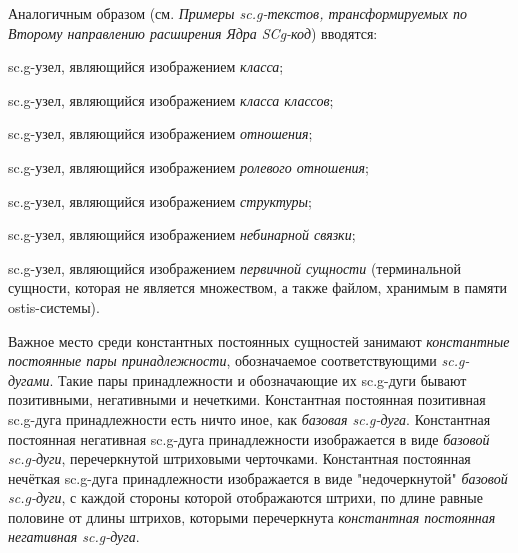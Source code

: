 \begin{SCn}
{Аналогичным образом (см. \textit{Примеры sc.g-текстов, трансформируемых по Второму направлению расширения Ядра SCg-код}) вводятся: 
\begin{scnitemize}
\item sc.g-узел, являющийся изображением \textit{класса};  
\item sc.g-узел, являющийся изображением \textit{класса классов};  
\item sc.g-узел, являющийся изображением \textit{отношения}; 
\item sc.g-узел, являющийся изображением \textit{ролевого отношения}; 
\item sc.g-узел, являющийся изображением \textit{структуры};  
\item sc.g-узел, являющийся изображением \textit{небинарной связки};
\item sc.g-узел, являющийся изображением \textit{первичной сущности} (терминальной сущности, которая не является множеством, а также файлом, хранимым в памяти ostis-системы).
\end{scnitemize}

Важное место среди константных постоянных сущностей занимают \textit{константные постоянные пары принадлежности}, обозначаемое соответствующими \textit{sc.g-дугами}. Такие пары принадлежности и обозначающие их sc.g-дуги бывают позитивными, негативными и нечеткими. Константная постоянная позитивная sc.g-дуга принадлежности есть ничто иное, как \textit{базовая sc.g-дуга}. Константная постоянная негативная sc.g-дуга принадлежности изображается в виде \textit{базовой sc.g-дуги}, перечеркнутой штриховыми черточками. Константная постоянная нечёткая sc.g-дуга принадлежности изображается в виде "недочеркнутой"{} \textit{базовой sc.g-дуги}, с каждой стороны которой отображаются штрихи, по длине равные половине от длины штрихов, которыми перечеркнута \textit{константная постоянная негативная sc.g-дуга}.}


\scnstructinclusion


\end{SCn}
